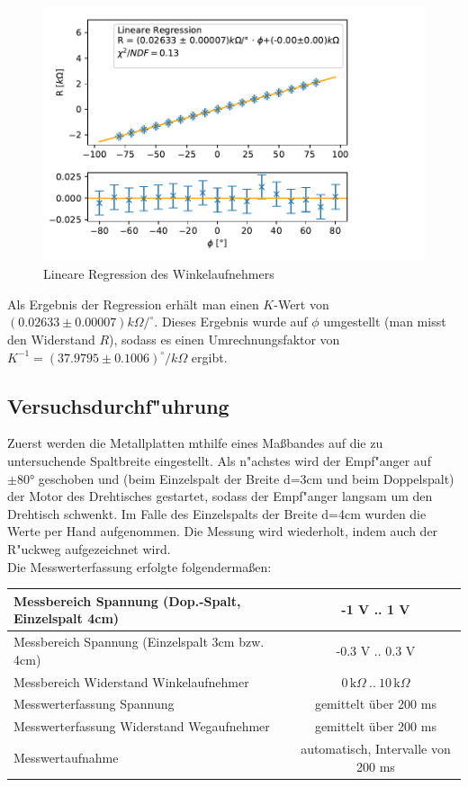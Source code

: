 \documentclass[12pt,a4paper]{article}
\begin{document}
\begin{figure}[H]
	\centering
	\includegraphics[width=0.7\linewidth]{Rohdaten/Images/Winkelkalib}
	\caption{Lineare Regression des Winkelaufnehmers}
	\label{fig:winkelkalib}
\end{figure}

Als Ergebnis der Regression erhält man einen $K$-Wert von $(0.02633\pm0.00007)k\Omega/^\circ$. Dieses Ergebnis wurde auf $\phi$ umgestellt (man misst den Widerstand $R$), sodass es einen Umrechnungsfaktor von $K^{-1} =(37.9795\pm0.1006)^\circ/k\Omega$ ergibt.




\subsection{Versuchsdurchf"uhrung}
Zuerst werden die Metallplatten mthilfe eines Ma\ss bandes auf die zu untersuchende Spaltbreite eingestellt.
Als n"achstes wird der Empf"anger auf $\pm\ang{80}$ geschoben und (beim Einzelspalt der Breite d=3cm und beim Doppelspalt) der Motor des Drehtisches gestartet, sodass der Empf"anger langsam um den Drehtisch schwenkt. Im Falle des Einzelspalts der Breite d=4cm wurden die Werte per Hand aufgenommen. Die Messung wird wiederholt, indem auch der R"uckweg aufgezeichnet wird.\\
Die Messwerterfassung erfolgte folgenderma\ss en:
\begin{table}[H]
	\centering
	\begin{tabular}{|l|c|}
		\hline 
		Messbereich Spannung (Dop.-Spalt, Einzelspalt 4cm)  & -1 V .. 1 V \\ 
		\hline 
		Messbereich Spannung (Einzelspalt 3cm bzw. 4cm)  & -0.3 V .. 0.3 V \\ 
		\hline 
		Messbereich Widerstand Winkelaufnehmer & $0\,\text{k}\Omega\ ..\ 10\,\text{k}\Omega$\\ 
		\hline 
		Messwerterfassung Spannung & gemittelt über 200 ms \\ 
		\hline
		Messwerterfassung Widerstand Wegaufnehmer & gemittelt über 200 ms \\ 
		\hline 
		Messwertaufnahme & automatisch, Intervalle von 200 ms \\ 
		\hline 

	\end{tabular} 
	\label{tab:MessparameterAllgemein}
\end{table}
\end{document}
